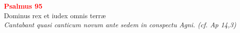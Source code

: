 


\def\greinitialformat#1{%
{\fontsize{39}{39}\selectfont #1}%
}




\vspace{0.3cm}
\begin{center}
 \textcolor{red}{\large \bf Psalmus 95}\\
Dominus rex et iudex omnis terræ\\
\textit{\small Cantabant quasi canticum novum ante sedem in conspectu Agni. (cf. Ap 14,3)}
\end{center}
